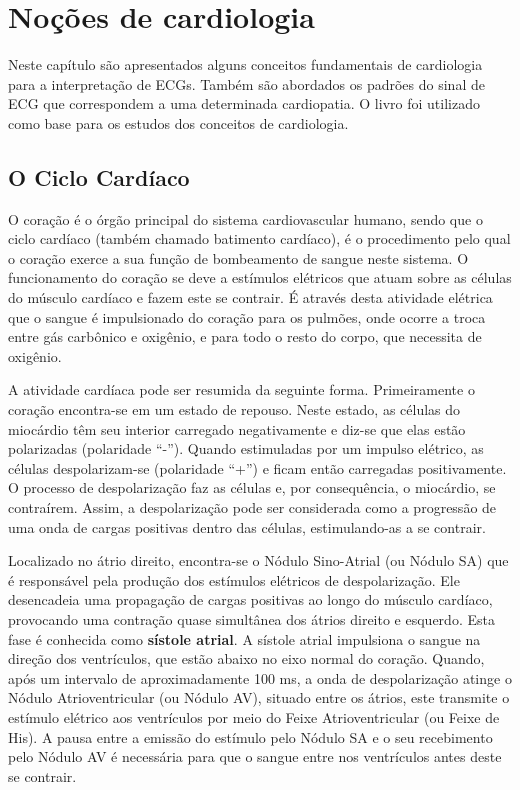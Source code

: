 
\chapter[Noções de cardiologia]{Noções de cardiologia}
\thispagestyle{empty}
\label{chap:chapter2}

Neste capítulo são apresentados alguns conceitos fundamentais de cardiologia para a interpretação de ECGs. Também são abordados os padrões do sinal de ECG que correspondem a uma determinada cardiopatia. O livro \cite{Dubin2000} foi utilizado como base para os estudos dos conceitos de cardiologia.

\section{O Ciclo Cardíaco}
O coração é o órgão principal do sistema cardiovascular humano, sendo que o ciclo cardíaco (também chamado batimento cardíaco), é o procedimento pelo qual o coração exerce a sua função de bombeamento de sangue neste sistema. O funcionamento do coração se deve a estímulos elétricos que atuam sobre as células do músculo cardíaco e fazem este se contrair. É através desta atividade elétrica que o sangue é impulsionado do coração para os pulmões, onde ocorre a troca entre gás carbônico e oxigênio, e para todo o resto do corpo, que necessita de oxigênio.

A atividade cardíaca pode ser resumida da seguinte forma. Primeiramente o coração encontra-se em um estado de repouso. Neste estado, as células do miocárdio têm seu interior carregado negativamente e diz-se que elas estão polarizadas (polaridade ``-''). Quando estimuladas por um impulso elétrico, as células despolarizam-se (polaridade ``+'') e ficam então carregadas positivamente. O processo de despolarização faz as células e, por consequência, o miocárdio, se contraírem. Assim, a despolarização pode ser considerada como a progressão de uma onda de cargas positivas dentro das células, estimulando-as a se contrair.

Localizado no átrio direito, encontra-se o Nódulo Sino-Atrial (ou Nódulo SA) que é responsável pela produção dos estímulos elétricos de despolarização. Ele desencadeia uma propagação de cargas positivas ao longo do músculo cardíaco, provocando uma contração quase simultânea dos átrios direito e esquerdo. Esta fase é conhecida como \textbf{sístole atrial}. A sístole atrial impulsiona o sangue na direção dos ventrículos, que estão abaixo no eixo normal do coração. Quando, após um intervalo de aproximadamente 100 ms, a onda de despolarização atinge o Nódulo Atrioventricular (ou Nódulo AV), situado entre os átrios, este transmite o estímulo elétrico aos ventrículos por meio do Feixe Atrioventricular (ou Feixe de His). A pausa entre a emissão do estímulo pelo Nódulo SA e o seu recebimento pelo Nódulo AV é necessária para que o sangue entre nos ventrículos antes deste se contrair.

